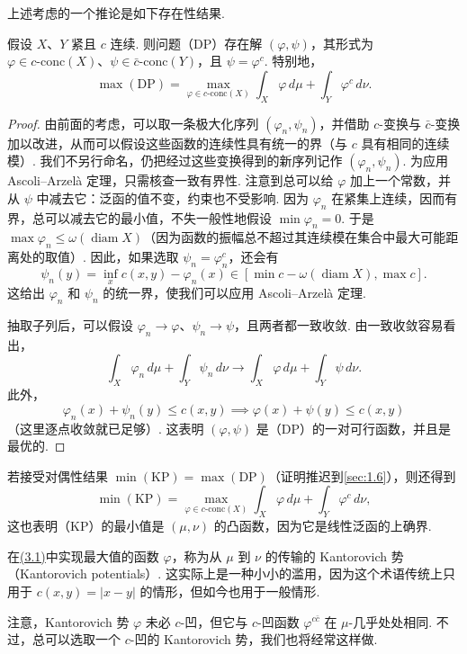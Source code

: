 上述考虑的一个推论是如下存在性结果.

\begin{proposition}\label{obj:1.11}
假设 $X$、$Y$ 紧且 $c$ 连续. 则问题（DP）存在解 $(\varphi,\psi)$，其形式为 $\varphi\in c\text{-}\mathrm{conc}(X)$、$\psi\in\bar c\text{-}\mathrm{conc}(Y)$，且 $\psi=\varphi^c$. 特别地，
\[
\max(\mathrm{DP})=\max_{\varphi\in c\text{-}\mathrm{conc}(X)}\int_X\varphi\,d\mu+\int_Y\varphi^c\,d\nu.
\]
\end{proposition}
\begin{proof}
由前面的考虑，可以取一条极大化序列 $(\varphi_n,\psi_n)$，并借助 $c$-变换与 $\bar c$-变换加以改进，从而可以假设这些函数的连续性具有统一的界（与 $c$ 具有相同的连续模）. 我们不另行命名，仍把经过这些变换得到的新序列记作 $(\varphi_n,\psi_n)$. 为应用 Ascoli--Arzelà 定理，只需核查一致有界性. 注意到总可以给 $\varphi$ 加上一个常数，并从 $\psi$ 中减去它：泛函的值不变，约束也不受影响. 因为 $\varphi_n$ 在紧集上连续，因而有界，总可以减去它的最小值，不失一般性地假设 $\min\varphi_n=0$. 于是 $\max\varphi_n\le\omega(\operatorname{diam}X)$（因为函数的振幅总不超过其连续模在集合中最大可能距离处的取值）. 因此，如果选取 $\psi_n=\varphi_n^c$，还会有
\[
\psi_n(y)=\inf_x c(x,y)-\varphi_n(x)
\in[\min c-\omega(\operatorname{diam}X),\max c].
\]
这给出 $\varphi_n$ 和 $\psi_n$ 的统一界，使我们可以应用 Ascoli--Arzelà 定理.

抽取子列后，可以假设 $\varphi_n\to\varphi$、$\psi_n\to\psi$，且两者都一致收敛. 由一致收敛容易看出，
\[
\int_X\varphi_n\,d\mu+\int_Y\psi_n\,d\nu
\to\int_X\varphi\,d\mu+\int_Y\psi\,d\nu.
\]
此外，
\[
\varphi_n(x)+\psi_n(y)\le c(x,y)\implies\varphi(x)+\psi(y)\le c(x,y)
\]
（这里逐点收敛就已足够）. 这表明 $(\varphi,\psi)$ 是（DP）的一对可行函数，并且是最优的.
\end{proof}

若接受对偶性结果 $\min(\mathrm{KP})=\max(\mathrm{DP})$（证明推迟到\autoref{sec:1.6}），则还得到
\[
\min(\mathrm{KP})=\max_{\varphi\in c\text{-}\mathrm{conc}(X)}\int_X\varphi\,d\mu+\int_Y\varphi^c\,d\nu,
\]
这也表明（KP）的最小值是 $(\mu,\nu)$ 的凸函数，因为它是线性泛函的上确界.

\begin{definition}\label{obj:1.12}
在\hyperref[eq:3.1]{(3.1)}中实现最大值的函数 $\varphi$，称为从 $\mu$ 到 $\nu$ 的传输的 Kantorovich 势（Kantorovich potentials）. 这实际上是一种小小的滥用，因为这个术语传统上只用于 $c(x,y)=|x-y|$ 的情形，但如今也用于一般情形.
\end{definition}

\begin{remark}\label{obj:1.13}
注意，Kantorovich 势 $\varphi$ 未必 $c$-凹，但它与 $c$-凹函数 $\varphi^{c\bar c}$ 在 $\mu$-几乎处处相同. 不过，总可以选取一个 $c$-凹的 Kantorovich 势，我们也将经常这样做.
\end{remark}
